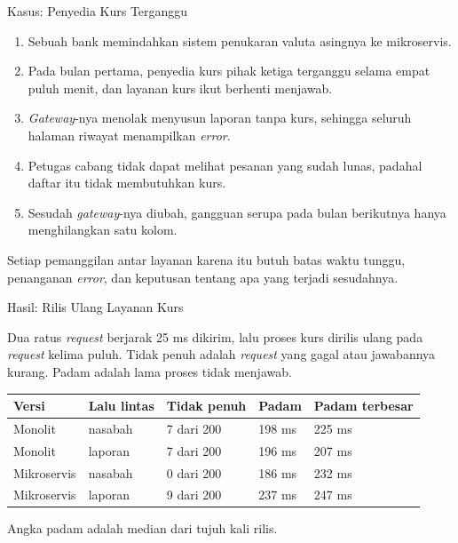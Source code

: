 \documentclass[aspectratio=169, table, 12pt]{beamer}
\begin{document}
\begin{frame}{{\Large Kasus: Penyedia Kurs Terganggu}}
  \vspace{8pt}
  \begin{enumerate}\small
    \item Sebuah bank memindahkan sistem penukaran valuta asingnya ke
          mikroservis.
    \item Pada bulan pertama, penyedia kurs pihak ketiga terganggu selama
          empat puluh menit, dan layanan kurs ikut berhenti menjawab.
    \item \textit{Gateway}-nya menolak menyusun laporan tanpa kurs, sehingga
          seluruh halaman riwayat menampilkan \textit{error}.
    \item Petugas cabang tidak dapat melihat pesanan yang sudah lunas, padahal
          daftar itu tidak membutuhkan kurs.
    \item Sesudah \textit{gateway}-nya diubah, gangguan serupa pada bulan
          berikutnya hanya menghilangkan satu kolom.
  \end{enumerate}

  \vspace{6pt}
  {\small Setiap pemanggilan antar layanan karena itu butuh batas waktu tunggu,
  penanganan \textit{error}, dan keputusan tentang apa yang terjadi
  sesudahnya.}
\end{frame}

\begin{frame}{{\Large Hasil: Rilis Ulang Layanan Kurs}}
  \vspace{10pt}
  \raggedright
  {\small Dua ratus \textit{request} berjarak 25 ms dikirim, lalu proses kurs
  dirilis ulang pada \textit{request} kelima puluh. Tidak penuh adalah
  \textit{request} yang gagal atau jawabannya kurang. Padam adalah lama proses
  tidak menjawab.}

  \vspace{4pt}
  \centering
  \small
  \begin{tabularx}{0.92\textwidth}{|l|X|l|l|l|}
    \hline
    \textbf{Versi} & \textbf{Lalu lintas} & \textbf{Tidak penuh} & \textbf{Padam} & \textbf{Padam terbesar} \\
    \hline
    Monolit & nasabah & 7 dari 200 & 198 ms & 225 ms \\
    \hline
    Monolit & laporan & 7 dari 200 & 196 ms & 207 ms \\
    \hline
    Mikroservis & nasabah & 0 dari 200 & 186 ms & 232 ms \\
    \hline
    Mikroservis & laporan & 9 dari 200 & 237 ms & 247 ms \\
    \hline
  \end{tabularx}

  \vspace{6pt}
  \raggedright
  {\small Angka padam adalah median dari tujuh kali rilis.}
\end{frame}
\end{document}
